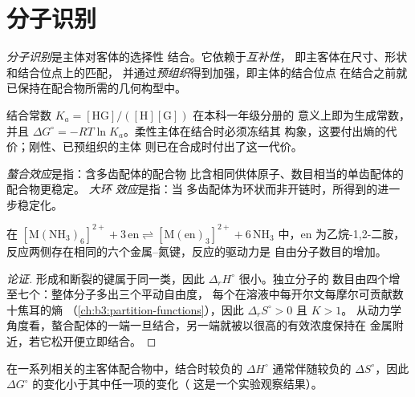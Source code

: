 \section{分子识别}

\begin{definition}[分子识别]\label{def:b3:supramolecular:recognition}
\emph{分子识别}是主体对客体的选择性
结合。它依赖于\emph{互补性}，
即主客体在尺寸、形状和结合位点上的匹配，
并通过\emph{预组织}得到加强，即主体的结合位点
在结合之前就已保持在配合物所需的几何构型中。
\end{definition}

结合常数 $K_a = [\mathrm{HG}]/([\mathrm H][\mathrm G])$ 在本科一年级分册的
意义上即为生成常数，并且 $\Delta G^\circ = -RT\ln K_a$。柔性主体在结合时必须冻结其
构象，这要付出熵的代价；刚性、已预组织的主体
则已在合成时付出了这一代价。

\begin{definition}[螯合效应与大环效应]\label{def:b3:supramolecular:macrocyclic}
\emph{螯合效应}是指：含多齿配体的配合物
比含相同供体原子、数目相当的单齿配体的配合物更稳定。
\emph{大环
效应}是指：当
多齿配体为环状而非开链时，所得到的进一步稳定化。
\end{definition}

\begin{proposition}[螯合效应主要是熵效应]\label{prop:b3:supramolecular:chelate-entropy}
在 $\mathrm{[M(NH_3)_6]^{2+} + 3\,en \rightleftharpoons [M(en)_3]^{2+} + 6\,NH_3}$ 中，en 为乙烷-1,2-二胺，
反应两侧存在相同的六个金属–氮键，反应的驱动力是
自由分子数目的增加。
\end{proposition}

\begin{proof}[论证]
形成和断裂的键属于同一类，因此 $\Delta_rH^\circ$ 很小。独立分子的
数目由四个增至七个：整体分子多出三个平动自由度，
每个在溶液中每开尔文每摩尔可贡献数十焦耳的熵
（\cref{ch:b3:partition-functions}），因此 $\Delta_rS^\circ > 0$ 且 $K > 1$。
从动力学角度看，螯合配体的一端一旦结合，另一端就被以很高的有效浓度保持在
金属附近，若它松开便立即结合。
\end{proof}

\begin{proposition}[焓–熵补偿]\label{prop:b3:supramolecular:compensation}
在一系列相关的主客体配合物中，结合时较负的 $\Delta H^\circ$
通常伴随较负的 $\Delta S^\circ$，因此 $\Delta G^\circ$ 的变化小于其中任一项的变化（
这是一个实验观察结果）。
\end{proposition}

